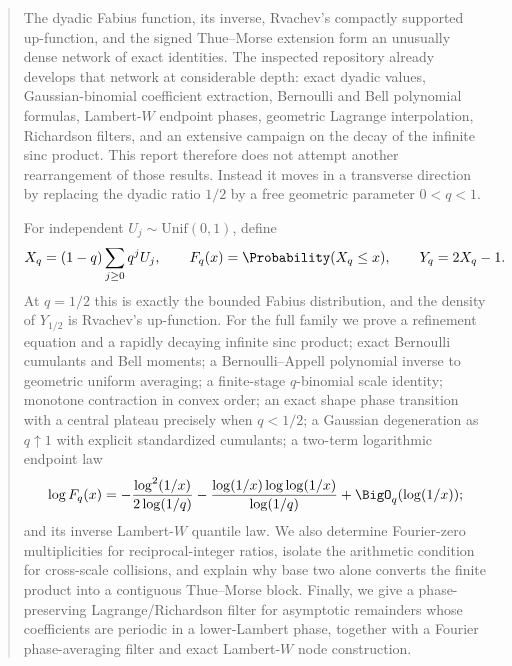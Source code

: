 \documentclass[11pt]{article}
\numberwithin{equation}{section}
\theoremstyle{definition}
\theoremstyle{remark}
\begin{document}
\begin{abstract}
The dyadic Fabius function, its inverse, Rvachev's compactly supported up-function,
and the signed Thue--Morse extension form an unusually dense network of exact identities.
The inspected repository already develops that network at considerable depth: exact dyadic
values, Gaussian-binomial coefficient extraction, Bernoulli and Bell polynomial formulas,
Lambert-$W$ endpoint phases, geometric Lagrange interpolation, Richardson filters, and an
extensive campaign on the decay of the infinite sinc product.  This report therefore does
not attempt another rearrangement of those results.  Instead it moves in a transverse
direction by replacing the dyadic ratio $1/2$ by a free geometric parameter $0<q<1$.

For independent $U_j\sim\mathrm{Unif}(0,1)$, define
\[
 X_q=(1-q)\sum_{j\ge0}q^jU_j,
 \qquad F_q(x)=\Probability(X_q\le x),
 \qquad Y_q=2X_q-1.
\]
At $q=1/2$ this is exactly the bounded Fabius distribution, and the density of $Y_{1/2}$
is Rvachev's up-function.  For the full family we prove a refinement equation and a
rapidly decaying infinite sinc product; exact Bernoulli cumulants and Bell moments; a
Bernoulli--Appell polynomial inverse to geometric uniform averaging; a finite-stage
$q$-binomial scale identity; monotone contraction in convex order; an exact shape phase
transition with a central plateau precisely when $q<1/2$; a Gaussian degeneration as
$q\uparrow1$ with explicit standardized cumulants; a two-term logarithmic endpoint law
\[
 \log F_q(x)
 =-\frac{\log^2(1/x)}{2\log(1/q)}
  -\frac{\log(1/x)\log\log(1/x)}{\log(1/q)}
  +\BigO_q(\log(1/x));
\]
and its inverse Lambert-$W$ quantile law.  We also determine Fourier-zero multiplicities
for reciprocal-integer ratios, isolate the arithmetic condition for cross-scale collisions,
and explain why base two alone converts the finite product into a contiguous Thue--Morse
block.  Finally, we give a phase-preserving Lagrange/Richardson filter for asymptotic
remainders whose coefficients are periodic in a lower-Lambert phase, together with a
Fourier phase-averaging filter and exact Lambert-$W$ node construction.


\end{abstract}
\end{document}
